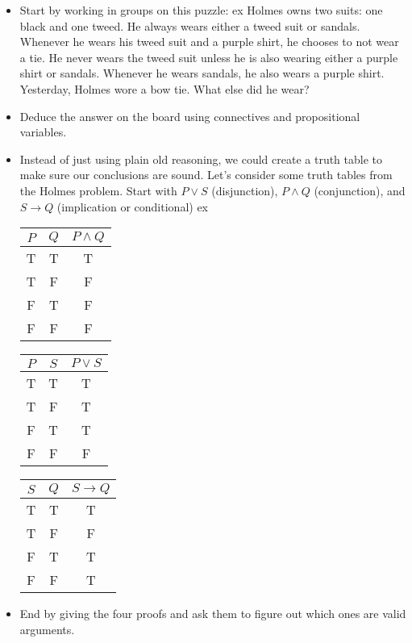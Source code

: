 \documentclass[12pt]{article}
\theoremstyle{plain}
\theoremstyle{definition}
\theoremstyle{remark}
\def\imp{\rightarrow}
\begin{document}
\begin{itemize}
  \item Start by working in groups on this puzzle:
   ex
Holmes owns two suits: one black and one tweed. He always wears either a tweed suit or sandals. Whenever he wears his tweed suit and a purple shirt, he chooses to not wear a tie. He never wears the tweed suit unless he is also wearing either a purple shirt or sandals. Whenever he wears sandals, he also wears a purple shirt. Yesterday, Holmes wore a bow tie. What else did he wear?


  \item Deduce the answer on the board using connectives and propositional variables.

\item Instead of just using plain old reasoning, we could create a truth table to make sure our conclusions are sound. Let's consider some truth tables from the Holmes problem. Start with $P\vee S$ (disjunction), $P\wedge Q$ (conjunction), and $S\imp Q$ (implication or conditional)
 ex
\begin{tabular}{c|c||c}
 $P$ & $Q$ & $P\wedge Q$ \\ \hline
 T & T & T\\
 T & F & F\\
 F & T & F\\
 F & F & F
\end{tabular}\hfill
\begin{tabular}{c|c||c}
 $P$ & $S$ & $P\vee S$ \\ \hline
 T & T & T\\
 T & F & T\\
 F & T & T\\
 F & F & F
\end{tabular}\hfill
\begin{tabular}{c|c||c}
 $S$ & $Q$ & $S\imp Q$ \\ \hline
 T & T & T\\
 T & F & F\\
 F & T & T\\
 F & F & T
\end{tabular}\hfill


%


  \item End by giving the four proofs and ask them to figure out which ones are valid arguments.

\end{itemize}
\end{document}

